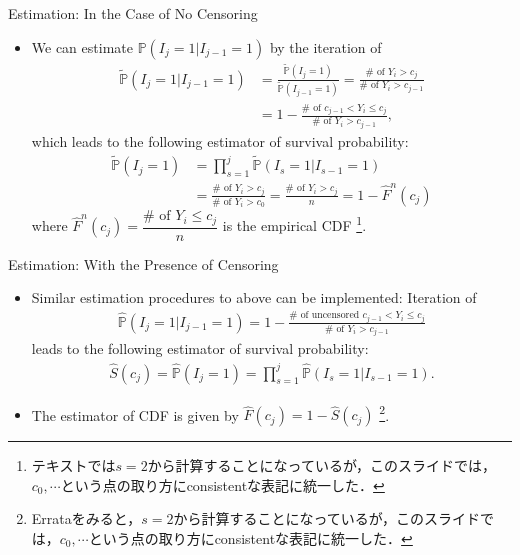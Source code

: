 \documentclass[xcolor=svgnames,dvipdfmx,cjk]{beamer}
\theoremstyle{example}
\def\P{\mathbb{P}}
\begin{document}
\begin{frame}{Estimation: In the Case of No Censoring}
      \begin{itemize}
            \item We can estimate $\P(I_j=1 | I_{j-1}=1)$ by the iteration of
                  \begin{align*}
                        \tilde{\P}(I_j=1|I_{j-1}=1)
                              &= \frac{\tilde{\P}(I_j=1)}{\tilde{\P}(I_{j-1}=1)} 
                               = \frac{\# \text{ of } Y_i > c_j}{\# \text{ of } Y_i > c_{j-1}} \\
                              &= 1- \frac{\# \text{ of } c_{j-1} < Y_i \leq c_j}{\# \text{ of } Y_i > c_{j-1}},
                  \end{align*}
                  which leads to the following estimator of survival probability:
                  \begin{align*}
                        \tilde{\P}(I_j=1) 
                              &= \prod_{s=1}^j \tilde{\P}(I_s=1 | I_{s-1}=1) \\
                              &= \frac{\# \text{ of } Y_i > c_j}{\# \text{ of } Y_i > c_0} = \frac{\# \text{ of } Y_i > c_j}{n} 
                               = 1 - \hat{F}^n(c_j)
                  \end{align*}
                  where $\hat{F}^n(c_j) = \dfrac{\# \text{ of } Y_i \leq c_j}{n}$ is the empirical CDF
                  \footnote{テキストでは$s=2$から計算することになっているが，このスライドでは，$c_0, \cdots$という点の取り方にconsistentな表記に統一した．}.
      \end{itemize}
\end{frame}

\begin{frame}{Estimation: With the Presence of Censoring}
      \begin{itemize}
            \item Similar estimation procedures to above can be implemented:
                  Iteration of 
                  \begin{align*}
                        \hat{\P}(I_j=1|I_{j-1}=1) = 1 -  \frac{\# \text{ of uncensored } c_{j-1} < Y_i \leq c_j}{\# \text{ of } Y_i > c_{j-1}}
                  \end{align*}
                  leads to the following estimator of survival probability:
                  \begin{align*}
                        \hat{S}(c_j) = \hat{\P}(I_j=1) = \prod_{s=1}^{j} \hat{\P}(I_s=1 | I_{s-1}=1).
                  \end{align*}
            \item The estimator of CDF is given by $\hat{F}(c_j) = 1 -  \hat{S}(c_j)$
                  \footnote{Errataをみると，$s=2$から計算することになっているが，このスライドでは，$c_0, \cdots$という点の取り方にconsistentな表記に統一した．}.
      \end{itemize}
\end{frame}
\end{document}
